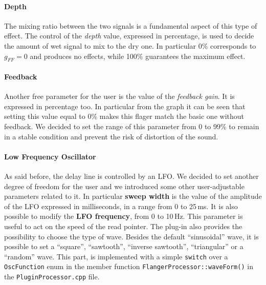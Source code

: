 \paragraph{Depth}
The mixing ratio between the two signals is a fundamental aspect of this type of effect. The control of the \emph{depth} value, expressed in percentage, is used to decide the amount of wet signal to mix to the dry one. In particular 0\% corresponds to $g_{FF} = 0$ and produces no effects, while 100\% guarantees the maximum effect.

\paragraph{Feedback}
Another free parameter for the user is the value of the \emph{feedback gain}. It is expressed in percentage too. In particular from the graph it can be seen that setting this value equal to 0\% makes this flager match the basic one without feedback. 
We decided to set the range of this parameter from 0 to 99\% to remain in a stable condition and prevent the risk of distortion of the sound.

\paragraph{Low Frequency Oscillator}
As said before, the delay line is controlled by an LFO.
We decided to set another degree of freedom for the user and we introduced some other user-adjustable parameters related to it.
In particular \textbf{sweep width} is the value of the amplitude of the LFO expressed in milliseconds, in a range from 0 to 25\,ms.
It is also possible to modify the \textbf{LFO frequency}, from 0 to 10\,Hz.
This parameter is useful to act on the speed of the read pointer.
The plug-in also provides the possibility to choose the type of wave.
Besides the default ``sinusoidal'' wave, it is possible to set a ``square'', ``sawtooth'', ``inverse sawtooth'', ``triangular'' or a ``random'' wave.
This part, is implemented with a simple \texttt{switch} over a \texttt{OscFunction} enum in the member function \texttt{FlangerProcessor::waveForm()} in the \texttt{PluginProcessor.cpp} file.
